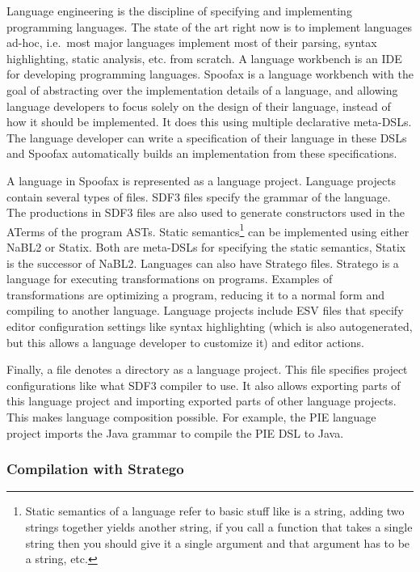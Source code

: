 Language engineering is the discipline of specifying and implementing programming languages.
The state of the art right now is to implement languages ad-hoc, i.e.\ most major languages implement most of their parsing, syntax highlighting, static analysis, etc. from scratch.
A language workbench is an \ac{IDE} for developing programming languages.
Spoofax is a language workbench with the goal of abstracting over the implementation details of a language, and allowing language developers to focus solely on the design of their language, instead of how it should be implemented.
It does this using multiple declarative meta-\acp{DSL}.
The language developer can write a specification of their language in these \acp{DSL} and Spoofax automatically builds an implementation from these specifications.

A language in Spoofax is represented as a language project.
Language projects contain several types of files.
\Ac{SDF3} files specify the grammar of the language.
The productions in \ac{SDF3} files are also used to generate constructors used in the ATerms of the program \acp{AST}.
Static semantics\footnote{Static semantics of a language refer to basic stuff like  is a string, adding two strings together yields another string, if you call a function that takes a single string then you should give it a single argument and that argument has to be a string, etc.}
can be implemented using either \ac{NaBL2} or Statix.
Both are meta-\acp{DSL} for specifying the static semantics, Statix is the successor of \ac{NaBL2}.
Languages can also have Stratego files.
Stratego is a language for executing transformations on programs.
Examples of transformations are optimizing a program, reducing it to a normal form and compiling to another language.
Language projects include \ac{ESV} files that specify editor configuration settings like syntax highlighting (which is also autogenerated, but this allows a language developer to customize it) and editor actions.

Finally, a  file denotes a directory as a language project.
This file specifies project configurations like what \ac{SDF3} compiler to use.
It also allows exporting parts of this language project and importing exported parts of other language projects.
This makes language composition possible.
For example, the \ac{PIE} language project imports the Java grammar to compile the \ac{PIE} \ac{DSL} to Java.

\subsubsection{Compilation with Stratego}
\label{subsubsec:problem_analysis__background__stratego}


